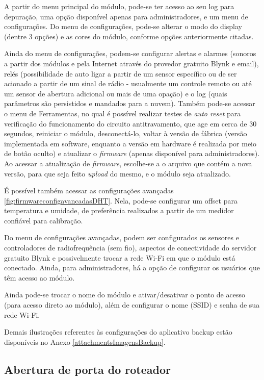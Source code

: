 A partir do menu principal do módulo, pode-se ter acesso ao seu log para depuração, uma opção disponível apenas para administradores, e um menu de configurações. Do menu de configurações, pode-se alterar o modo do display (dentre 3 opções) e as cores do módulo, conforme opções anteriormente citadas.

Ainda do menu de configurações, podem-se configurar alertas e alarmes (sonoros a partir dos módulos e pela Internet através do provedor gratuito Blynk e email), relés (possibilidade de auto ligar a partir de um sensor específico ou de ser acionado a partir de um sinal de rádio - usualmente um controle remoto ou até um sensor de abertura adicional ou mais de uma opação) e o log (quais parâmetros são persistidos e mandados para a nuvem). Também pode-se acessar o menu de Ferramentas, no qual é possível realizar testes de \emph{auto reset} para verificação do funcionamento do circuito antitravamento, que age em cerca de 30 segundos, reiniciar o módulo, desconectá-lo, voltar à versão de fábrica (versão implementada em software, enquanto a versão em hardware é realizada por meio de botão oculto) e atualizar o \emph{firmware} (apenas disponível para administradores).
Ao acessar a atualização de \emph{firmware}, escolhe-se a o arquivo que contém a nova versão, para que seja feito \emph{upload} do mesmo, e o módulo seja atualizado.

É possível também acessar as configurações avançadas \ref{fig:firmwareconfigavancadasDHT}. Nela, pode-se configurar um offset para temperatura e umidade, de preferência realizados a partir de um medidor confiável para calibração.

Do menu de configurações avançadas, podem ser configurados os sensores e controladores de radiofrequência (sem fio), aspectos de conectividade do servidor gratuito Blynk e possivelmente trocar a rede Wi-Fi em que o módulo está conectado. Ainda, para administradores, há a opção de configurar os usuários que têm acesso ao módulo.

Ainda pode-se trocar o nome do módulo e ativar/desativar o ponto de acesso (para acesso direto ao módulo), além de configurar o nome (SSID) e senha de sua rede Wi-Fi.

Demais ilustrações referentes às configurações do aplicativo backup estão disponíveis no Anexo \ref{attachmentsImagensBackup}{}.

\subsection{Abertura de porta do roteador}

